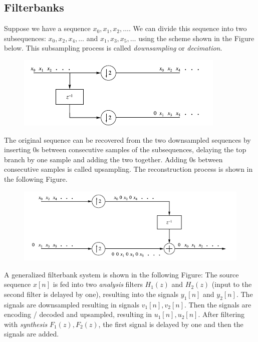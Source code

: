 \subsection{Filterbanks}

Suppose we have a sequence $x_0, x_1, x_2 , \ldots$. We can divide this sequence into two subsequences: $x_0, x_2, x_4, \ldots$ and $x_1, x_3, x_5, \ldots$ using the scheme shown in the Figure below. This subsampling process is called \emph{downsampling} or \emph{decimation}.

\begin{figure}[H]
    \centering
    \includegraphics[scale=0.7]{images/2021-11-09-subband_02.png}
\end{figure}



The original sequence can be recovered from the two downsampled sequences by inserting $0$s between consecutive samples of the subsequences, delaying the top branch by one sample and adding the two together. Adding $0$s between consecutive samples is called upsampling. The reconstruction process is shown in the following Figure.

\begin{figure}[H]
    \centering
    \includegraphics[scale=0.7]{images/2021-11-09-subband_03.png}
\end{figure}


A generalized filterbank system is shown in the following Figure: The source sequence $x[n]$ is fed into two \emph{analysis} filters $H_1(z)$ and $H_2(z)$ (input to the second filter is delayed by one), resulting into the signals $y_1[n]$ and $y_2[n]$. The signals are downsampled resulting in signals $v_1[n], v_2[n]$. Then the signals are encoding / decoded and upsampled, resulting in $u_1[n], u_2[n]$. After filtering with \emph{synthesis} $F_1(z), F_2(z)$, the first signal is delayed by one and then the signals are added.

